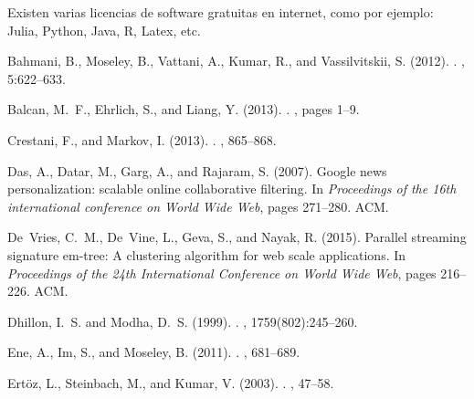 \documentclass[10pt]{article}
\begin{document}
Existen varias licencias de software gratuitas en internet, como por ejemplo: Julia, Python, Java, R, Latex, etc. 

\newpage

% 
\begin{thebibliography}{}

Bahmani, B., Moseley, B., Vattani, A., Kumar, R., and Vassilvitskii, S. (2012).
.
, 5:622--633.

Balcan, M.~F., Ehrlich, S., and Liang, Y. (2013).
.
, pages 1--9.

Crestani, F., and Markov, I. (2013).
.
, 865--868.

Das, A., Datar, M., Garg, A., and Rajaram, S. (2007).
\newblock Google news personalization: scalable online collaborative filtering.
\newblock In {\em Proceedings of the 16th international conference on World
  Wide Web}, pages 271--280. ACM.

De~Vries, C.~M., De~Vine, L., Geva, S., and Nayak, R. (2015).
\newblock Parallel streaming signature em-tree: A clustering algorithm for web
  scale applications.
\newblock In {\em Proceedings of the 24th International Conference on World
  Wide Web}, pages 216--226. ACM.

Dhillon, I.~S. and Modha, D.~S. (1999).
.
, 1759(802):245--260.

Ene, A., Im, S., and Moseley, B. (2011).
.
, 681--689.

Ert{\"o}z, L., Steinbach, M., and Kumar, V. (2003).
.
, 47--58.


\end{thebibliography}
\end{document}
